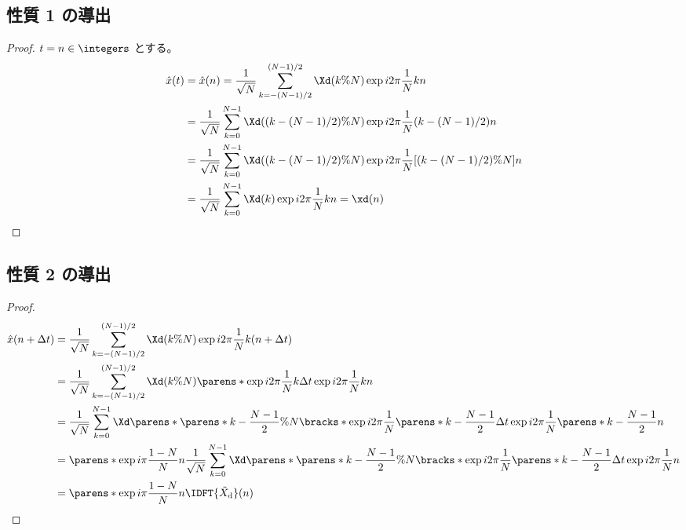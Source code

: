         \subsection{性質 1 の導出}
            \begin{proof}
                \quad\par
                $t = n\in\integers$ とする。
                \begin{align*}
                    \hat{x}(t) &= \hat{x}(n) = \frac{1}{\sqrt{N}}\sum_{k=-(N-1)/2}^{(N-1)/2}\Xd(k\%N)\exp i2\pi\frac{1}{N}kn \\
                    &= \frac{1}{\sqrt{N}}\sum_{k=0}^{N-1}\Xd((k-(N-1)/2)\%N)\exp i2\pi\frac{1}{N}(k-(N-1)/2)n \\
                    &= \frac{1}{\sqrt{N}}\sum_{k=0}^{N-1}\Xd((k-(N-1)/2)\%N)\exp i2\pi\frac{1}{N}[(k-(N-1)/2)\%N]n \\
                    &= \frac{1}{\sqrt{N}}\sum_{k=0}^{N-1}\Xd(k)\exp i2\pi\frac{1}{N}kn = \xd(n)
                \end{align*}
            \end{proof}
        \subsection{性質 2 の導出}
            \begin{proof}
                \begin{align*}
                    \hat{x}(n+\Delta t) &= \frac{1}{\sqrt{N}}\sum_{k=-(N-1)/2}^{(N-1)/2}\Xd(k\%N)\exp i2\pi\frac{1}{N}k(n+\Delta t) \\
                    &= \frac{1}{\sqrt{N}}\sum_{k=-(N-1)/2}^{(N-1)/2}\Xd(k\%N)\parens*{\exp i2\pi\frac{1}{N}k\Delta t}\exp i2\pi\frac{1}{N}kn \\
                    &= \frac{1}{\sqrt{N}}\sum_{k=0}^{N-1}\Xd\parens*{\parens*{k-\frac{N-1}{2}}\%N}\bracks*{\exp i2\pi\frac{1}{N}\parens*{k-\frac{N-1}{2}}\Delta t}\exp i2\pi\frac{1}{N}\parens*{k-\frac{N-1}{2}}n \\
                    &= \parens*{\exp i\pi\frac{1-N}{N}n}\frac{1}{\sqrt{N}}\sum_{k=0}^{N-1}\Xd\parens*{\parens*{k-\frac{N-1}{2}}\%N}\bracks*{\exp i2\pi\frac{1}{N}\parens*{k-\frac{N-1}{2}}\Delta t}\exp i2\pi\frac{1}{N}n \\
                    &= \parens*{\exp i\pi\frac{1-N}{N}n}\IDFT{\Xtilded}(n)
                \end{align*}
            \end{proof}
